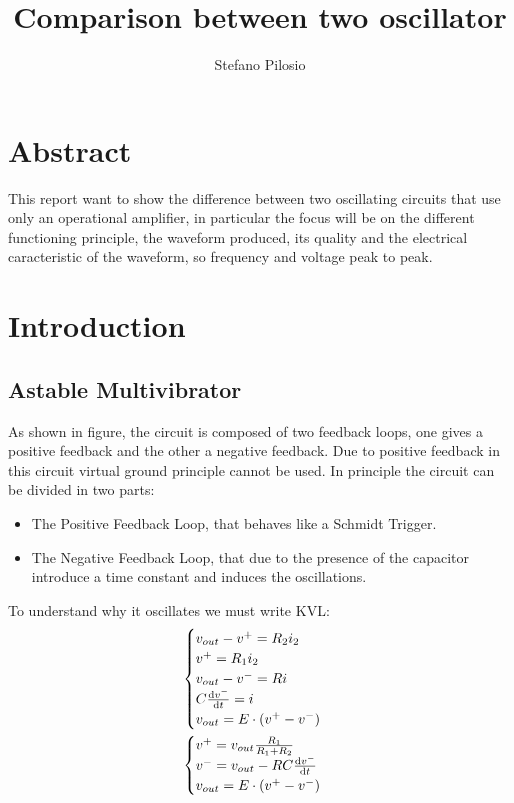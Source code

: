 \documentclass[a4paper, twocolumn]{article}
\begin{document}
\title{Comparison between two oscillator}
\author{Stefano Pilosio}

\maketitle

\section{Abstract}

This report want to show the difference between two oscillating circuits that use only an operational amplifier, in particular the focus will be on the different functioning principle, the waveform produced, its quality and the electrical caracteristic of the waveform, so frequency and voltage peak to peak.

\section{Introduction}

\subsection{Astable Multivibrator}

%     

As shown in figure, the circuit is composed of two feedback loops, one gives a positive feedback and the other a negative feedback. Due to positive feedback in this circuit virtual ground principle cannot be used. In principle the circuit can be divided in two parts:

\begin{itemize}
    \item The Positive Feedback Loop, that behaves like a Schmidt Trigger.
    \item The Negative Feedback Loop, that due to the presence of the capacitor introduce a time constant and induces the oscillations.
\end{itemize}

To understand why it oscillates we must write KVL:
\begin{gather}
    \begin{cases}
        v_{out} - v^+ = R_2i_2\\
        v^+= R_1i_2\\
        v_{out}-v^- = R i\\
        C\dv{v^-}{t}= i\\
        v_{out} = E \cdot (v^+-v^-)
    \end{cases}\\
    \begin{cases}
        \label{eq:genStable}
        v^+=v_{out}\frac{R_1}{R_1+R_2}\\
        v^-=v_{out}-RC\dv{v^-}{t}\\
        v_{out} = E \cdot (v^+-v^-)
    \end{cases}
\end{gather}
\end{document}
